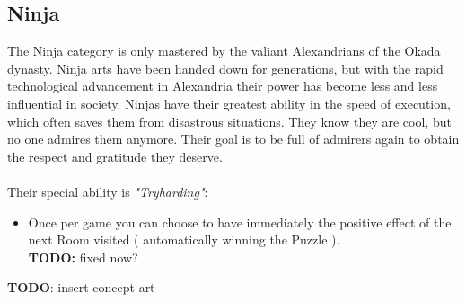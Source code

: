 \subsection{Ninja}
The Ninja category is only mastered by the valiant Alexandrians of the Okada dynasty. Ninja arts have been handed down for generations, but with the rapid technological advancement in Alexandria their power has become less and less influential in society. Ninjas have their greatest ability in the speed of execution, which often saves them from disastrous situations. They know they are cool, but no one admires them anymore. Their goal is to be full of admirers again to obtain the respect and gratitude they deserve.\\\\
Their special ability is \textit{"Tryharding"}:
\begin{itemize}
\item Once per game you can choose to have immediately the positive effect of the next Room visited ( automatically winning the Puzzle ). \\\textbf{TODO:} fixed now?
\end{itemize}
\textbf{TODO}: insert concept art